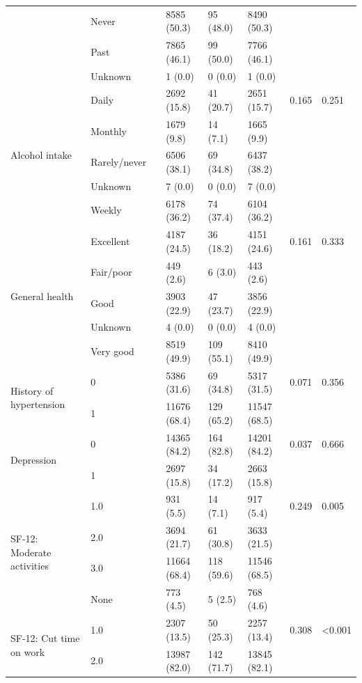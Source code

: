\begin{tabular}{llllllll}
 & Never &  & 8585 (50.3) & 95 (48.0) & 8490 (50.3) &  &  \\
 & Past &  & 7865 (46.1) & 99 (50.0) & 7766 (46.1) &  &  \\
 & Unknown &  & 1 (0.0) & 0 (0.0) & 1 (0.0) &  &  \\
\cline{1-8}
\multirow[t]{5}{*}{Alcohol intake} & Daily &  & 2692 (15.8) & 41 (20.7) & 2651 (15.7) & 0.165 & 0.251 \\
 & Monthly &  & 1679 (9.8) & 14 (7.1) & 1665 (9.9) &  &  \\
 & Rarely/never &  & 6506 (38.1) & 69 (34.8) & 6437 (38.2) &  &  \\
 & Unknown &  & 7 (0.0) & 0 (0.0) & 7 (0.0) &  &  \\
 & Weekly &  & 6178 (36.2) & 74 (37.4) & 6104 (36.2) &  &  \\
\cline{1-8}
\multirow[t]{5}{*}{General health} & Excellent &  & 4187 (24.5) & 36 (18.2) & 4151 (24.6) & 0.161 & 0.333 \\
 & Fair/poor &  & 449 (2.6) & 6 (3.0) & 443 (2.6) &  &  \\
 & Good &  & 3903 (22.9) & 47 (23.7) & 3856 (22.9) &  &  \\
 & Unknown &  & 4 (0.0) & 0 (0.0) & 4 (0.0) &  &  \\
 & Very good &  & 8519 (49.9) & 109 (55.1) & 8410 (49.9) &  &  \\
\cline{1-8}
\multirow[t]{2}{*}{History of hypertension} & 0 &  & 5386 (31.6) & 69 (34.8) & 5317 (31.5) & 0.071 & 0.356 \\
 & 1 &  & 11676 (68.4) & 129 (65.2) & 11547 (68.5) &  &  \\
\cline{1-8}
\multirow[t]{2}{*}{Depression} & 0 &  & 14365 (84.2) & 164 (82.8) & 14201 (84.2) & 0.037 & 0.666 \\
 & 1 &  & 2697 (15.8) & 34 (17.2) & 2663 (15.8) &  &  \\
\cline{1-8}
\multirow[t]{4}{*}{SF-12: Moderate activities} & 1.0 &  & 931 (5.5) & 14 (7.1) & 917 (5.4) & 0.249 & 0.005 \\
 & 2.0 &  & 3694 (21.7) & 61 (30.8) & 3633 (21.5) &  &  \\
 & 3.0 &  & 11664 (68.4) & 118 (59.6) & 11546 (68.5) &  &  \\
 & None &  & 773 (4.5) & 5 (2.5) & 768 (4.6) &  &  \\
\cline{1-8}
\multirow[t]{3}{*}{SF-12: Cut time on work} & 1.0 &  & 2307 (13.5) & 50 (25.3) & 2257 (13.4) & 0.308 & <0.001 \\
 & 2.0 &  & 13987 (82.0) & 142 (71.7) & 13845 (82.1) &  &  \\

\end{tabular}
